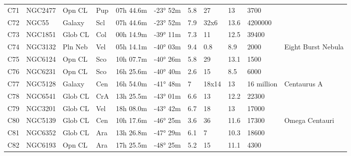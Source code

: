 \begin{table}[h]
\begin{tabular}{@{}lllllllllll@{}}
C71        & NGC2477     & Opn CL     & Pup       & 07h 44.6m & -23° 52m  & 5.8       & 27                   & 13       & 3700                &                                 \\
C72        & NGC55       & Galaxy     & Scl       & 07h 44.6m & -23° 52m  & 7.9       & 32x6                 & 13.6     & 4200000             &                                 \\
C73        & NGC1851     & Glob CL    & Col       & 00h 14.9m & -39° 11m  & 7.3       & 11                   & 12.5     & 39400               &                                 \\
C74        & NGC3132     & Pln Neb    & Vel       & 05h 14.1m & -40° 03m  & 9.4       & 0.8                  & 8.9      & 2000                & Eight Burst Nebula              \\
C75        & NGC6124     & Opn CL     & Sco       & 10h 07.7m & -40° 26m  & 5.8       & 29                   & 13.1     & 1500                &                                 \\
C76        & NGC6231     & Opn CL     & Sco       & 16h 25.6m & -40° 40m  & 2.6       & 15                   & 8.5      & 6000                &                                 \\
C77        & NGC5128     & Galaxy     & Cen       & 16h 54.0m & -41° 48m  & 7         & 18x14                & 13       & 16 million          & Centaurus A                     \\
C78        & NGC6541     & Glob CL    & CrA       & 13h 25.5m & -43° 01m  & 6.6       & 13                   & 12.2     & 22300               &                                 \\
C79        & NGC3201     & Glob CL    & Vel       & 18h 08.0m & -43° 42m  & 6.7       & 18                   & 13       & 17000               &                                 \\
C80        & NGC5139     & Glob CL    & Cen       & 10h 17.6m & -46° 25m  & 3.6       & 36                   & 11.6     & 17300               & Omega Centauri                  \\
C81        & NGC6352     & Glob CL    & Ara       & 13h 26.8m & -47° 29m  & 6.1       & 7                    & 10.3     & 18600               &                                 \\
C82        & NGC6193     & Opn CL     & Ara       & 17h 25.5m & -48° 25m  & 5.2       & 15                   & 11.1     & 4300                &                                 \\

\end{tabular}
\end{table}
